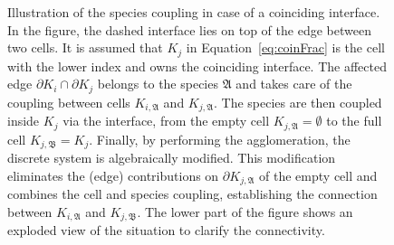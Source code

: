 \documentclass{article}
\begin{document}
\begin{figure}[h]
    \centering
    
    \caption{Illustration of the species coupling in case of a coinciding interface. In the figure, the dashed interface lies on top of the edge between two cells. It is assumed that \( K_{j} \) in Equation~\ref{eq:coinFrac} is the cell with the lower index and owns the coinciding interface. The affected edge \( \partial K_i \cap \partial K_j \) belongs to the species \( \mathfrak{A} \) and takes care of the coupling between cells \( K_{i,\mathfrak{A}} \) and \( K_{j,\mathfrak{A}} \). The species are then coupled inside \( K_{j} \) via the interface, from the empty cell \( K_{j,\mathfrak{A}} = \emptyset \) to the full cell \( K_{j,\mathfrak{B}} = K_{j} \). Finally, by performing the agglomeration, the discrete system is algebraically modified. This modification eliminates the (edge) contributions on \( \partial K_{j,\mathfrak{A}} \) of the empty cell and combines the cell and species coupling, establishing the connection between \( K_{i,\mathfrak{A}} \) and \( K_{j,\mathfrak{B}} \). The lower part of the figure shows an exploded view of the situation to clarify the connectivity.}
    \label{fig:speciesCoupling}
\end{figure}
\end{document}
